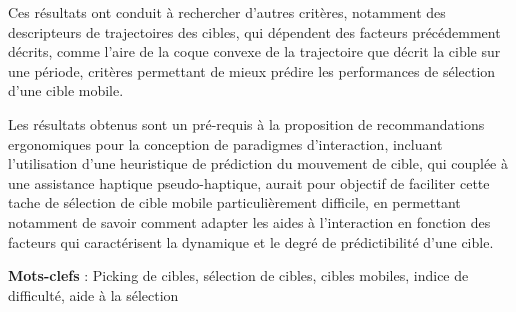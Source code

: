 Ces résultats ont conduit à rechercher d’autres critères, notamment des descripteurs de trajectoires des cibles, qui dépendent des facteurs précédemment décrits, comme l’aire de la coque convexe de la trajectoire que décrit la cible sur une période, critères permettant de mieux prédire les performances de sélection d’une cible mobile.

Les résultats obtenus sont un pré-requis à la proposition de recommandations ergonomiques pour la conception de paradigmes d’interaction, incluant l’utilisation d’une heuristique de prédiction du mouvement de cible, qui couplée à une assistance haptique pseudo-haptique, aurait pour objectif de faciliter cette tache de sélection de cible mobile particulièrement difficile, en permettant notamment de savoir comment adapter les aides à l’interaction en fonction des facteurs qui caractérisent la dynamique et le degré de prédictibilité d’une cible. 


\textbf{Mots-clefs} : Picking de cibles, sélection de cibles, cibles mobiles, indice de difficulté, aide à la sélection
